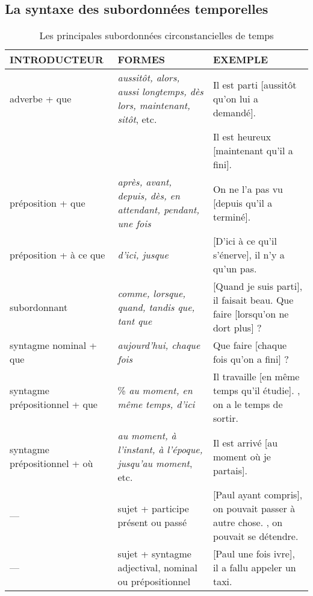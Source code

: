 \documentclass[UTF8]{report}
\begin{document}
\subsection{La syntaxe des subordonnées temporelles}
\begin{table}[H]
    \centering
    \small
    \begin{tabular}{|p{3.5cm}|p{6cm}|p{6.5cm}|}
    \hline
    \rowcolor{cyan!20}
    \textbf{INTRODUCTEUR} & \textbf{FORMES} & \textbf{EXEMPLE} \\
    \hline
    adverbe + que & \textit{aussitôt, alors, aussi longtemps, dès lors, maintenant, sitôt}, etc. & Il est parti [aussitôt qu'on lui a demandé]. \\
    & & Il est heureux [maintenant qu'il a fini]. \\
    \hline
    préposition + que & \textit{après, avant, depuis, dès, en attendant, pendant, une fois} & On ne l'a pas vu [depuis qu'il a terminé]. \\
    \hline
    préposition + à ce que & \textit{d'ici, jusque} & [D'ici à ce qu'il s'énerve], il n'y a qu'un pas. \\
    \hline
    subordonnant & \textit{comme, lorsque, quand, tandis que, tant que} & [Quand je suis parti], il faisait beau. 
    \newline Que faire [lorsqu'on ne dort plus] ? \\
    \hline
    syntagme nominal + que & \textit{aujourd'hui, chaque fois} & Que faire [chaque fois qu'on a fini] ? \\
    \hline
    syntagme prépositionnel + que & \% \textit{au moment, en même temps, d'ici} & Il travaille [en même temps qu'il étudie]. 
    , on a le temps de sortir. \\
    \hline
    syntagme prépositionnel + où & \textit{au moment, à l'instant, à l'époque, jusqu'au moment}, etc. & Il est arrivé [au moment où je partais]. \\
    \hline
    --- & sujet + participe présent ou passé & [Paul ayant compris], on pouvait passer à autre chose. 
    , on pouvait se détendre. \\
    \hline
    --- & sujet + syntagme adjectival, nominal ou prépositionnel & [Paul une fois ivre], il a fallu appeler un taxi. \\
    \hline
    \end{tabular}
    \caption{Les principales subordonnées circonstancielles de temps}
\end{table}
\end{document}
